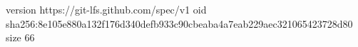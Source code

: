 version https://git-lfs.github.com/spec/v1
oid sha256:8e105e880a132f176d340defb933c90cbeaba4a7eab229aec321065423728d80
size 66
